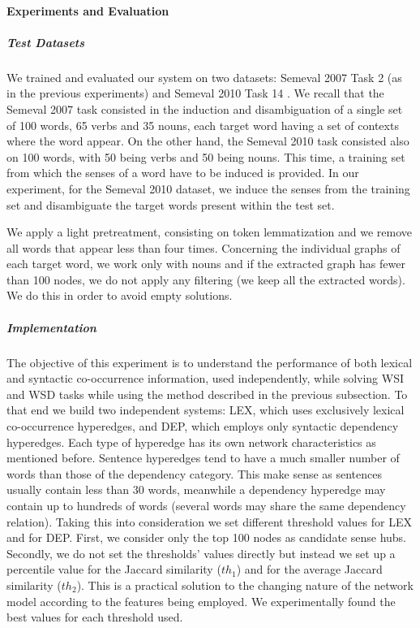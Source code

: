 	
\paragraph{Experiments and Evaluation}
\subparagraph{Test Datasets}
We trained and evaluated our system on two datasets: Semeval 2007 Task 2 (as in the previous experiments) and Semeval 2010 Task 14 \cite{Semeval2010}. We recall that the Semeval 2007 task consisted in the induction and disambiguation of a single set of 100 words, 65 verbs and 35 nouns, each target word having a set of contexts where the word appear. On the other hand, the Semeval 2010 task consisted also on 100 words, with 50 being verbs and 50 being nouns. This time, a training set from which the senses of a word have to be induced is provided. In our experiment, for the Semeval 2010 dataset, we induce the senses from the training set and disambiguate the target words present within the test set.

We apply a light pretreatment, consisting on token lemmatization and we remove all words that appear less than four times. Concerning the individual graphs of each target word, we work only with nouns and if the extracted graph has fewer than 100 nodes, we do not apply any filtering (we keep all the extracted words). We do this in order to avoid empty solutions.



\subparagraph{Implementation}
The objective of this experiment is to understand the performance of both lexical and syntactic co-occurrence information, used independently, while solving WSI and WSD tasks while using the method described in the previous subsection. To that end we build two independent systems: LEX, which uses exclusively lexical co-occurrence hyperedges, and DEP, which employs only syntactic dependency hyperedges. 
Each type of hyperedge has its own network characteristics as mentioned before. Sentence hyperedges tend to have a much smaller number of words than those of the dependency category. This make sense as sentences usually contain less than 30 words, meanwhile a dependency hyperedge may contain up to hundreds of words (several words may share the same dependency relation). Taking this into consideration we set different threshold values for LEX and for DEP. First, we  consider only the top 100 nodes as candidate sense hubs. Secondly, we do not set the thresholds' values directly but instead we set up a percentile value for the Jaccard similarity ($th_1$) and for the average Jaccard similarity ($th_2$). This is a practical solution to the changing nature of the network model according to the features being employed. We experimentally found the best values for  each threshold used.



